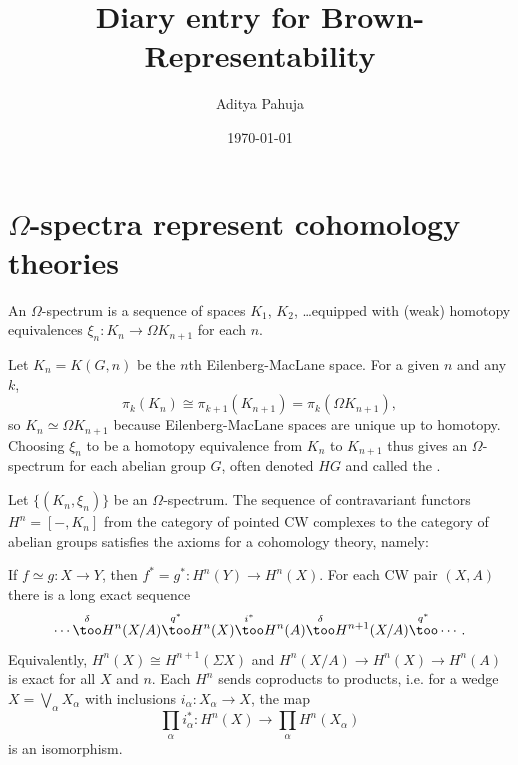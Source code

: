 \documentclass[10pt]{article}
\title{Diary entry for Brown-Representability}
\author{Aditya Pahuja}
\date{\today}
\begin{document}
\maketitle
\tableofcontents
\pagebreak

\section{$\Omega$-spectra represent cohomology theories}
\begin{definition}
    \label{def:omega-spectrum}
    An $\Omega$-spectrum is a sequence of spaces
    $K_1$, $K_2$, \dots equipped with (weak) homotopy equivalences
    $\xi_n\colon K_n\to\Omega K_{n+1}$ for each $n$.
\end{definition}

\begin{example}
    Let $K_n = K(G,n)$ be the $n$th Eilenberg-MacLane space.
    For a given $n$ and any $k$,
    \begin{equation*}
	\pi_k(K_n)\cong \pi_{k+1}(K_{n+1})
	= \pi_k(\Omega K_{n+1}),
    \end{equation*}
    so $K_n\simeq\Omega K_{n+1}$
    because Eilenberg-MacLane spaces are unique up to homotopy.
    Choosing $\xi_n$ to be a homotopy equivalence
    from $K_n$ to $K_{n+1}$ thus gives an $\Omega$-spectrum
    for each abelian group $G$, often denoted $HG$
    and called the .
\end{example}

\begin{theorem}
    \label{thm:omega-spectra-cohomology}
    Let $\{(K_n,\xi_n)\}$ be an $\Omega$-spectrum.
    The sequence of contravariant functors $H^n = [-,K_n]$
    from the category of pointed CW complexes
    to the category of abelian groups satisfies
    the axioms for a cohomology theory, namely:
    \begin{enumerate}[(i)]
        \ii If $f\simeq g\colon X\to Y$, then
	$f^* = g^*\colon H^n(Y)\to H^n(X)$.
	\ii For each CW pair $(X,A)$ there is a long exact sequence
	\begin{equation*}
	    \cdots
	    \overset\delta\too H^n(X/A)
	    \overset{q^*}\too H^n(X)
	    \overset{i^*}\too H^n(A)
	    \overset\delta\too H^{n+1}(X/A)
	    \overset{q^*}\too\cdots.
	\end{equation*}
	Equivalently, $H^n(X)\cong H^{n+1}(\Sigma X)$
	and $H^n(X/A)\to H^n(X)\to H^n(A)$ is exact for all $X$ and $n$.
	\ii Each $H^n$ sends coproducts to products,
	i.e. for a wedge $X = \bigvee_\alpha X_\alpha$
	with inclusions $i_\alpha\colon X_\alpha\to X$, the map
	\begin{equation*}
	    \prod_\alpha i_\alpha^*\colon H^n(X)\to\prod_\alpha H^n(X_\alpha)
	\end{equation*}
	is an isomorphism.
    \end{enumerate}
\end{theorem}
\end{document}
